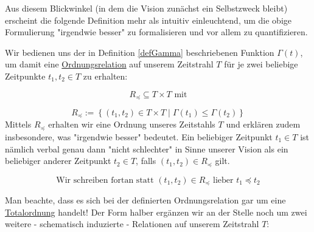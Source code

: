 Aus diesem Blickwinkel (in dem die Vision zunächst ein Selbstzweck bleibt) erscheint die folgende Definition mehr als intuitiv einleuchtend, um die obige Formulierung "irgendwie besser" zu formalisieren und vor allem zu quantifizieren. 

\vspace{0.3cm}

\begin{Def}\label{defRelation}

Wir bedienen uns der in Definition \ref{defGamma} beschriebenen Funktion $\Gamma(t)$, um damit eine \href{https://de.wikipedia.org/wiki/Ordnungsrelation}{Ordnungsrelation} 
auf unserem Zeitstrahl $T$ für je zwei beliebige Zeitpunkte $t_1, t_2 \in T$ zu erhalten: 

\vspace{0.3cm}

\begin{equation*}
  R_{\preceq} \subseteq T \times T \textrm{ mit}
\end{equation*}

\begin{equation*}
  R_{\preceq}:= \left\{ (t_1, t_2) \in T \times T \mid \Gamma(t_1) \leq \Gamma(t_2) \right\}
\end{equation*}
\vspace{1cm}
Mittels $R_{\preceq}$ erhalten wir eine Ordnung unseres Zeitstahls $T$ und erklären zudem insbesondere, was "irgendwie besser" bedeutet. Ein beliebiger Zeitpunkt $t_1 \in T$ ist nämlich verbal genau dann "nicht schlechter" in Sinne unserer Vision als ein beliebiger anderer Zeitpunkt $t_2 \in T$, falls $(t_1, t_2) \in R_{\preceq}$ gilt.

\vspace{0.3cm}

\begin{equation*}
  \textrm{Wir schreiben fortan statt } (t_1, t_2) \in R_{\preceq} \textrm{ lieber } t_1 \preceq t_2 
\end{equation*}

\end{Def}

\vspace{1cm}

Man beachte, dass es sich bei der definierten Ordnungsrelation gar um eine \href{https://de.wikipedia.org/wiki/Ordnungsrelation#Totalordnung}{Totalordnung} handelt!
Der Form halber ergänzen wir an der Stelle noch um zwei weitere - schematisch induzierte - Relationen auf unserem Zeitstrahl $T$:

